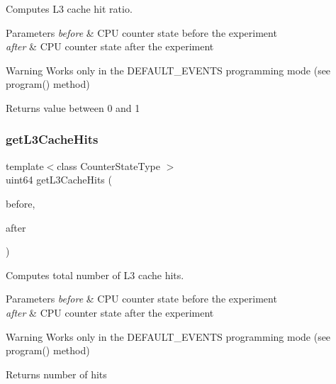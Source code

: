 Computes L3 cache hit ratio. 


\begin{DoxyParams}{Parameters}
{\em before} & C\+PU counter state before the experiment \\
\hline
{\em after} & C\+PU counter state after the experiment \\
\hline
\end{DoxyParams}
\begin{DoxyWarning}{Warning}
Works only in the D\+E\+F\+A\+U\+L\+T\+\_\+\+E\+V\+E\+N\+TS programming mode (see program() method) 
\end{DoxyWarning}
\begin{DoxyReturn}{Returns}
value between 0 and 1 
\end{DoxyReturn}
\mbox{\label{class_basic_counter_state_a7ba16714ef7ed547ad8648cb5b9e52f6}} 
\subsubsection{\texorpdfstring{get\+L3\+Cache\+Hits}{getL3CacheHits}}
{\footnotesize\ttfamily template$<$class Counter\+State\+Type $>$ \\
uint64 get\+L3\+Cache\+Hits (\begin{DoxyParamCaption}\item[{const Counter\+State\+Type \&}]{before,  }\item[{const Counter\+State\+Type \&}]{after }\end{DoxyParamCaption})\hspace{0.3cm}{\ttfamily [friend]}}



Computes total number of L3 cache hits. 


\begin{DoxyParams}{Parameters}
{\em before} & C\+PU counter state before the experiment \\
\hline
{\em after} & C\+PU counter state after the experiment \\
\hline
\end{DoxyParams}
\begin{DoxyWarning}{Warning}
Works only in the D\+E\+F\+A\+U\+L\+T\+\_\+\+E\+V\+E\+N\+TS programming mode (see program() method) 
\end{DoxyWarning}
\begin{DoxyReturn}{Returns}
number of hits 
\end{DoxyReturn}
\mbox{\label{class_basic_counter_state_ace0e3ffc23c20d0eda7663cb7e4899a2}} 
